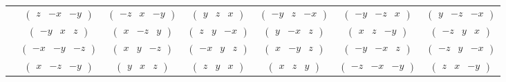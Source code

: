 \documentclass[fleqn,9pt,landscape]{jsarticle}
\begin{document}
\begin{center}
\begin{longtable}{ccccccc}
& $ \begin{pmatrix} z & - x & - y \end{pmatrix} $ & $ \begin{pmatrix} - z & x & - y \end{pmatrix} $ & $ \begin{pmatrix} y & z & x \end{pmatrix} $ & $ \begin{pmatrix} - y & z & - x \end{pmatrix} $ & $ \begin{pmatrix} - y & - z & x \end{pmatrix} $ & $ \begin{pmatrix} y & - z & - x \end{pmatrix} $ \\
& $ \begin{pmatrix} - y & x & z \end{pmatrix} $ & $ \begin{pmatrix} x & - z & y \end{pmatrix} $ & $ \begin{pmatrix} z & y & - x \end{pmatrix} $ & $ \begin{pmatrix} y & - x & z \end{pmatrix} $ & $ \begin{pmatrix} x & z & - y \end{pmatrix} $ & $ \begin{pmatrix} - z & y & x \end{pmatrix} $ \\
& $ \begin{pmatrix} - x & - y & - z \end{pmatrix} $ & $ \begin{pmatrix} x & y & - z \end{pmatrix} $ & $ \begin{pmatrix} - x & y & z \end{pmatrix} $ & $ \begin{pmatrix} x & - y & z \end{pmatrix} $ & $ \begin{pmatrix} - y & - x & z \end{pmatrix} $ & $ \begin{pmatrix} - z & y & - x \end{pmatrix} $ \\
& $ \begin{pmatrix} x & - z & - y \end{pmatrix} $ & $ \begin{pmatrix} y & x & z \end{pmatrix} $ & $ \begin{pmatrix} z & y & x \end{pmatrix} $ & $ \begin{pmatrix} x & z & y \end{pmatrix} $ & $ \begin{pmatrix} - z & - x & - y \end{pmatrix} $ & $ \begin{pmatrix} z & x & - y \end{pmatrix} $ \\

\end{longtable}
\end{center}
\end{document}
